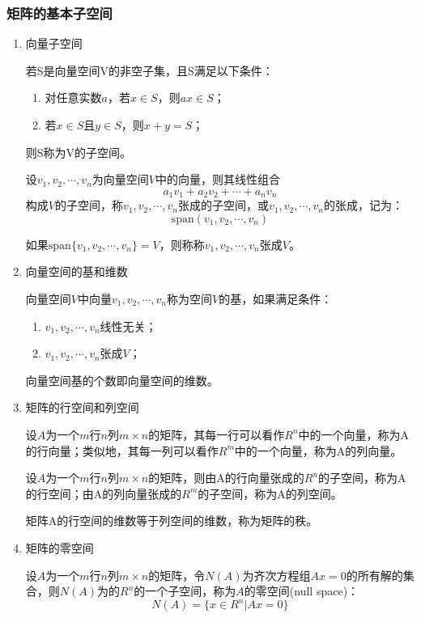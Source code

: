\documentclass{article}
\begin{document}
\subsubsection{矩阵的基本子空间}
\begin{enumerate}[label = {\Roman*.}]

\item 向量子空间

若S是向量空间V的非空子集，且S满足以下条件：
\begin{enumerate}[label = {\roman*.}]
\item 对任意实数$a$，若$x \in S$，则$ax \in S$；

\item 若$x \in S$且$y \in S$，则$x+y=S$；
\end{enumerate}
则S称为V的子空间。

设$v_1,v_2,\cdots,v_n$为向量空间$V$中的向量，则其线性组合
$$
a_1v_1+a_2v_2+\cdots+a_nv_n
$$
构成$V$的子空间，称$v_1,v_2,\cdots,v_n$张成的子空间，或$v_1,v_2,\cdots,v_n$的张成，记为：
$$
\text{span}(v_1,v_2,\cdots,v_n)
$$

如果$\text{span}\{v_1,v_2,\cdots,v_n\}=V$，则称称$v_1,v_2,\cdots,v_n$张成$V$。
\item 向量空间的基和维数

向量空间$V$中向量$v_1,v_2,\cdots,v_n$称为空间$V$的基，如果满足条件：
\begin{enumerate}[label = {\roman*.}]
\item $v_1,v_2,\cdots,v_n$线性无关；

\item $v_1,v_2,\cdots,v_n$张成$V$；
\end{enumerate}
向量空间基的个数即向量空间的维数。

\item 矩阵的行空间和列空间

设$A$为一个$m$行$n$列$m \times n$的矩阵，其每一行可以看作$R^n$中的一个向量，称为A的行向量；类似地，其每一列可以看作$R^m$中的一个向量，称为A的列向量。

设$A$为一个$m$行$n$列$m \times n$的矩阵，则由A的行向量张成的$R^n$的子空间，称为A的行空间；由A的列向量张成的$R^m$的子空间，称为A的列空间。

矩阵A的行空间的维数等于列空间的维数，称为矩阵的秩。

\item 矩阵的零空间

设$A$为一个$m$行$n$列$m \times n$的矩阵，令$N(A)$为齐次方程组$Ax=0$的所有解的集合，则$N(A)$为的$R^n$的一个子空间，称为$A$的零空间(null space)：
\begin{equation}
    N(A) = \{x \in R^n|Ax=0\}
\end{equation}


\end{enumerate}
\end{document}
